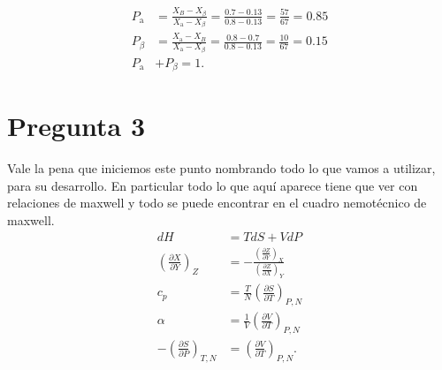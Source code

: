 \documentclass{report}
\begin{document}
\begin{enumerate}
     \begin{align*}
       P_{\text{a}} &= \frac{X_B - X_{\beta}}{X_{\text{a}}-X_{\beta}}=\frac{0.7 - 0.13}{0.8-0.13}=\frac{57}{67}=0.85\\
       P_{\beta} &= \frac{X_{\text{a}}-X_B}{X_{\text{a}}-X_{\beta}}=\frac{0.8-0.7}{0.8-0.13}=\frac{10}{67}=0.15\\
       P_{\text{a}} &+ P_{\beta} = 1
    .\end{align*}
\end{enumerate}

\chapter{Pregunta 3}

Vale la pena que iniciemos este punto nombrando todo lo que vamos a utilizar, para su desarrollo. En particular todo lo que aquí aparece tiene que ver con relaciones de maxwell y todo se puede encontrar en el cuadro nemotécnico de maxwell.
\begin{align*}
  dH &= TdS + VdP \\
  \left( \frac{\partial X}{\partial Y}  \right)_Z &= -\frac{\left( \frac{\partial Z}{\partial Y}  \right)_X}{\left( \frac{\partial Z}{\partial X}  \right)_Y} \\
  c_p &= \frac{T}{N}\left( \frac{\partial S}{\partial T}  \right)_{P,N}\\
  \alpha &= \frac{1}{V}\left( \frac{\partial V}{\partial T}  \right)_{P,N} \\
  - \left( \frac{\partial S}{\partial P}  \right)_{T,N} &= \left( \frac{\partial V}{\partial T}  \right)_{P,N}
.\end{align*}
\end{document}
